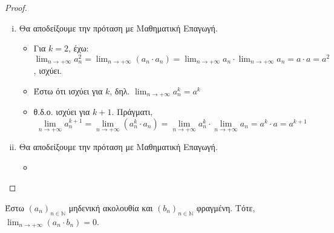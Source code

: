 \documentclass[main.tex]{subfiles}
\begin{document}
\begin{proof}
\begin{enumerate}[i)]
        \item 
            Θα αποδείξουμε την πρόταση με Μαθηματική Επαγωγή.
            \begin{itemize}
                \item Για $ k=2 $, έχω: $ \lim_{n \to +\infty} 
                    a_{n}^{2} = \lim_{n \to
                    +\infty} (a_{n} \cdot a_{n}) = 
                    \lim_{n \to +\infty} a_{n} \cdot 
                    \lim_{n \to +\infty}
                    a_{n} =  a \cdot a = a^{2}  $, ισχύει.
                \item Έστω ότι ισχύει για $k$, δηλ. $ 
                    \lim_{n \to +\infty} a_{n}^{k} = a^{k}  $
                \item θ.δ.ο. ισχύει για $ k+1 $. Πράγματι, 
                    \[
                        \lim_{n \to +\infty} a_{n}^{k+1}= 
                        \lim_{n \to +\infty} (a_{n}^{k} \cdot a_{n})  
                        = \lim_{n \to +\infty} a_{n}^{k} \cdot 
                        \lim_{n \to +\infty} a_{n} = a^{k} \cdot a = 
                        a^{k+1}
                    \] 
            \end{itemize}

        \item 
            Θα αποδείξουμε την πρόταση με Μαθηματική Επαγωγή.
            \begin{itemize}
                \item     
            \end{itemize}

    \end{enumerate}
\end{proof}

\begin{prop}
\item {}
    Έστω $ (a_{n})_{n \in \mathbb{N}} $ μηδενική ακολουθία και 
    $ (b_{n})_{n \in \mathbb{N}} $ 
    φραγμένη. Τότε, $ \lim_{n \to +\infty} (a_{n}\cdot b_{n}) = 0 $. 
\end{prop}
\end{document}
